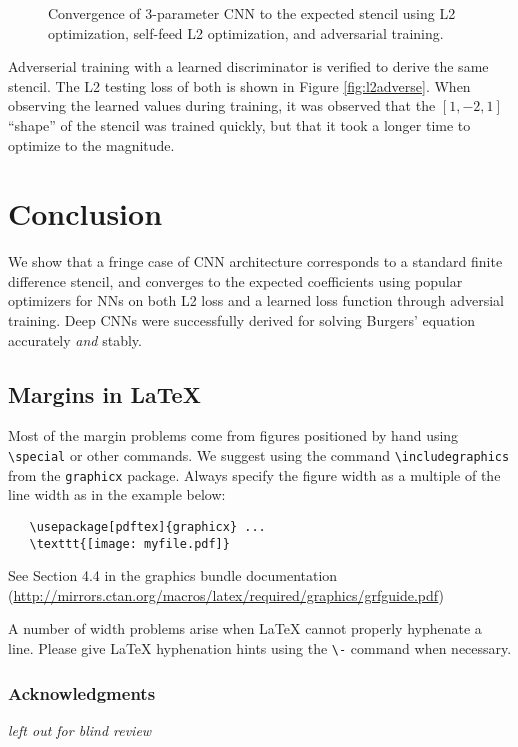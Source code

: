 \documentclass{article}
\begin{document}
\begin{figure}
  \centering
  \fbox{\rule[-.5cm]{0cm}{4cm} \rule[-.5cm]{4cm}{0cm}}
  \caption{Convergence of 3-parameter CNN to the expected stencil using L2 optimization, self-feed L2 optimization, and adversarial training.}
\end{figure}


Adverserial training with a learned discriminator is verified to derive the same stencil. The L2 testing loss of both is shown in Figure \ref{fig:l2adverse}. When observing the learned values during training, it was observed that the $[1,-2,1]$ ``shape'' of the stencil was trained quickly, but that it took a longer time to optimize to the magnitude.

\section{Conclusion}
\label{sec:conclusion}

We show that a fringe case of CNN architecture corresponds to a standard finite difference stencil, and converges to the expected coefficients using popular optimizers for NNs on both L2 loss and a learned loss function through adversial training.
Deep CNNs were successfully derived for solving Burgers' equation accurately {\em and } stably.


\subsection{Margins in \LaTeX{}}

Most of the margin problems come from figures positioned by hand using
\verb+\special+ or other commands. We suggest using the command
\verb+\includegraphics+ from the \verb+graphicx+ package. Always specify the
figure width as a multiple of the line width as in the example below:
\begin{verbatim}
   \usepackage[pdftex]{graphicx} ...
   \texttt{[image: myfile.pdf]}
\end{verbatim}
See Section 4.4 in the graphics bundle documentation
(\url{http://mirrors.ctan.org/macros/latex/required/graphics/grfguide.pdf})

A number of width problems arise when \LaTeX{} cannot properly hyphenate a
line. Please give LaTeX hyphenation hints using the \verb+\-+ command when
necessary.

\subsubsection*{Acknowledgments}

{\em left out for blind review}






\end{document}
